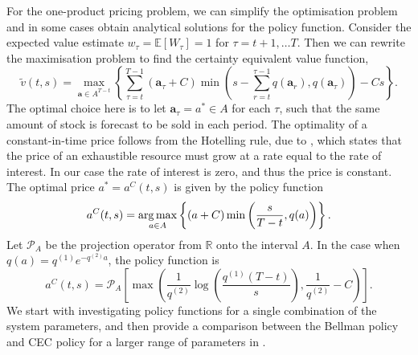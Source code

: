 \documentclass[main.tex]{subfiles}
\begin{document}
For the one-product pricing problem, we can simplify the optimisation
problem and in some cases obtain analytical solutions for the policy function.
Consider the expected value estimate $w_\tau=\mathbb{E}
[W_\tau]=1$ for $\tau=t+1,\dots T$.
Then we can rewrite the maximisation problem to find
the certainty equivalent value function,
\begin{equation}
  \widetilde{v}(t,s)=
  \max_{\mathbf{a}\in A^{T-t}}\left\{\sum_{\tau=t}^{T-1}(\mathbf{a}_\tau
    +C)\min\left(s-\sum_{r=t}^{\tau-1}q(\mathbf{a}_r),q(\mathbf{a}_\tau)\right)-Cs\right\}.
\end{equation}
The optimal choice here is to let $\mathbf{a}_\tau=a^*\in A$ for each
$\tau$, such that the same amount of stock is forecast to be sold in
each period. The optimality of a constant-in-time price follows from the Hotelling
rule, due to \citet{hotelling1931economics}, which states that the
price of an exhaustible resource must
grow at a rate equal to the rate of interest. In our case the rate of
interest is zero, and thus the price is constant.
The optimal price $a^*=a^C(t,s)$ is given by the policy function
\begin{equation}
  a^C(t,s)=\operatorname*{arg\,max}_{a\in A} \left\{(a+C)\min\left(
      \frac{s}{T-t},q(a)
    \right)\right\}.
\end{equation}
Let $\mathcal{P}_A$ be the projection operator from $\mathbb{R}$ onto the interval $A$.
In the case when $q(a)=q^{(1)}e^{-q^{(2)}a}$, the policy function is
\begin{equation}\label{eq:cec_policy}
  a^C(t,s)=\mathcal{P}_A\left[
    \max\left( \frac{1}{q^{(2)}}\log\left( \frac{q^{(1)}(T-t)}{s}\right),
      \frac{1}{q^{(2)}}-C  \right)\right].
\end{equation}
We start with investigating policy functions for a
single combination of the  system
parameters, and then provide a
comparison between the Bellman policy and CEC policy for a larger
range of parameters in .
\end{document}
